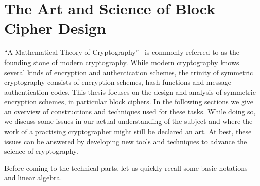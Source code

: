 \chapter{The Art and Science of Block Cipher Design}\label{ch:prelim}

\hspace{1.5em} \enquote{A Mathematical Theory of Cryptography}~ is commonly referred to as the founding stone of modern cryptography.
While modern cryptography knows several kinds of encryption and authentication schemes, the trinity of symmetric cryptography consists of encryption schemes, hash functions and message authentication codes.
This thesis focuses on the design and analysis of symmetric encryption schemes, in particular block ciphers.
In the following sections we give an overview of constructions and techniques used for these tasks.
While doing so, we discuss some issues in our actual understanding of the subject and where the work of a practising cryptographer might still be declared an art.
At best, these issues can be answered by developing new tools and techniques to advance the science of cryptography.

Before coming to the technical parts, let us quickly recall some basic notations and linear algebra.
